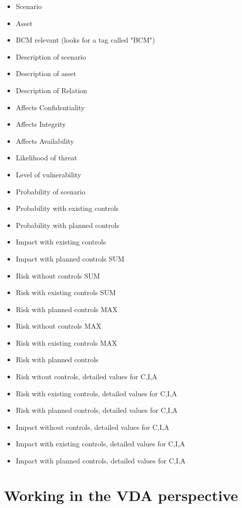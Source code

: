 \documentclass[a4paper,10pt]{book}
\begin{document}
\begin{itemize}
\item Scenario
\item Asset
\item BCM relevant (looks for a tag called "BCM")
\item Description of scenario
\item Description of asset
\item Description of Relation
\item Affects Confidentiality
\item Affects Integrity
\item Affects Availability
\item Likelihood of threat
\item Level of vulnerability
\item Probability of scenario
\item Probability with existing controls
\item Probability with planned controls
\item Impact with existing controls
\item Impact with planned controls SUM
\item Risk without controls SUM
\item Risk with existing controls SUM
\item Risk with planned controls MAX
\item Risk without controls MAX
\item Risk with existing controls MAX
\item Risk with planned controls
\item Risk witout controls, detailed values for C,I,A
\item Risk with existing controls, detailed values for C,I,A
\item Risk with planned controls, detailed values for C,I,A
\item Impact without controls, detailed values for C,I,A
\item Impact with existing controls, detailed values for C,I,A
\item Impact with planned controls, detailed values for C,I,A
\end{itemize}

\chapter{Working in the VDA perspective} \label{chap:working-in-the-vda-perspective}
\end{document}

